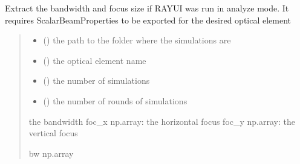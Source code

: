 \documentclass[letterpaper,10pt,english]{sphinxmanual}
\begin{document}
\begin{fulllineitems}
\begin{fulllineitems}
\label{\detokenize{code_documentation:raypyng.postprocessing.PostProcessAnalyzed.retrieve_bw_and_focusSize}}
\pysigstartsignatures
{}
\pysigstopsignatures
\sphinxAtStartPar
Extract the bandwidth and focus size if RAY\sphinxhyphen{}UI was run in analyze mode.
It requires ScalarBeamProperties to be exported for the desired optical element
\begin{quote}\begin{description}
\begin{itemize}
\item {} 
\sphinxAtStartPar
{} () \textendash{} the path to the folder where the simulations are

\item {} 
\sphinxAtStartPar
{} () \textendash{} the optical element name

\item {} 
\sphinxAtStartPar
{} () \textendash{} the number of simulations

\item {} 
\sphinxAtStartPar
{} () \textendash{} the number of rounds of simulations

\end{itemize}

\sphinxAtStartPar
the bandwidth
foc\_x np.array: the horizontal focus
foc\_y np.array: the vertical focus

\sphinxAtStartPar
bw np.array

\end{description}\end{quote}

\end{fulllineitems}


\end{fulllineitems}
\end{document}
